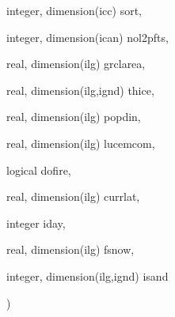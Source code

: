 {\begin{DoxyParamCaption}
\item[{integer, dimension(icc)}]{sort, }
\item[{integer, dimension(ican)}]{nol2pfts, }
\item[{real, dimension(ilg)}]{grclarea, }
\item[{real, dimension(ilg,ignd)}]{thice, }
\item[{real, dimension(ilg)}]{popdin, }
\item[{real, dimension(ilg)}]{lucemcom, }
\item[{logical}]{dofire, }
\item[{real, dimension(ilg)}]{currlat, }
\item[{integer}]{iday, }
\item[{real, dimension(ilg)}]{fsnow, }
\item[{integer, dimension(ilg,ignd)}]{isand}
\end{DoxyParamCaption}
)}\label{group__disturbance__scheme__disturb_ga43f1709a7ea90ed6c9c37f54c2f5478b}

